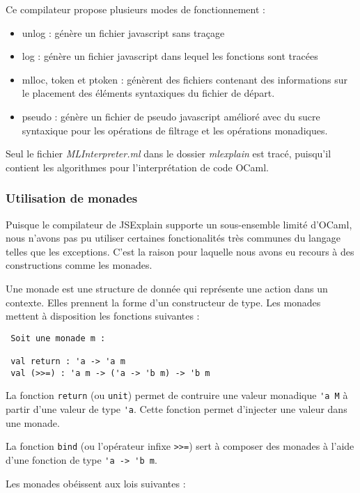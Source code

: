 \documentclass[a4paper,10pt]{report}
\begin{document}
Ce compilateur propose plusieurs modes de fonctionnement :

\begin{itemize}
 \item unlog : génère un fichier javascript sans traçage
 \item log : génère un fichier javascript dans lequel les fonctions sont tracées
 \item mlloc, token et ptoken : génèrent des fichiers contenant des informations
sur le placement des éléments syntaxiques du fichier de départ.
 \item pseudo : génère un fichier de pseudo javascript amélioré avec du sucre 
syntaxique pour les opérations de filtrage et les opérations monadiques.
\end{itemize}

Seul le fichier \emph{MLInterpreter.ml} dans le dossier \emph{mlexplain} est 
tracé, puisqu'il contient les algorithmes pour l'interprétation de code OCaml.

\subsubsection{Utilisation de monades}
Puisque le compilateur de JSExplain supporte un sous-ensemble limité d'OCaml, 
nous n'avons pas pu utiliser certaines fonctionalités très communes du langage 
telles que les exceptions. C'est la raison pour laquelle nous avons eu recours 
à des constructions comme les monades.

Une monade est une structure de donnée qui représente une action dans un 
contexte. Elles prennent la forme d'un constructeur de type. Les monades 
mettent à disposition les fonctions suivantes :

\begin{verbatim}
 Soit une monade m :
 
 val return : 'a -> 'a m
 val (>>=) : 'a m -> ('a -> 'b m) -> 'b m
\end{verbatim}

La fonction \verb|return| (ou \verb|unit|) permet de contruire une valeur 
monadique \verb|'a M| à partir d'une valeur de type \verb|'a|. Cette fonction 
permet d'injecter une valeur dans une monade.

La fonction \verb|bind| (ou l'opérateur infixe \verb|>>=|) sert à composer des 
monades à l'aide d'une fonction de type \verb|'a -> 'b m|.


Les monades obéissent aux lois suivantes :
\end{document}
